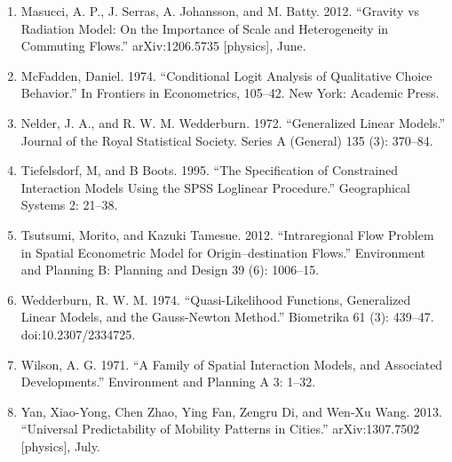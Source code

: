 \documentclass[11pt]{article}
\begin{document}
\begin{enumerate}
  (5): 941--67.
\item
  Masucci, A. P., J. Serras, A. Johansson, and M. Batty. 2012. ``Gravity
  vs Radiation Model: On the Importance of Scale and Heterogeneity in
  Commuting Flows.'' arXiv:1206.5735 {[}physics{]}, June.
\item
  McFadden, Daniel. 1974. ``Conditional Logit Analysis of Qualitative
  Choice Behavior.'' In Frontiers in Econometrics, 105--42. New York:
  Academic Press.
\item
  Nelder, J. A., and R. W. M. Wedderburn. 1972. ``Generalized Linear
  Models.'' Journal of the Royal Statistical Society. Series A (General)
  135 (3): 370--84.
\item
  Tiefelsdorf, M, and B Boots. 1995. ``The Specification of Constrained
  Interaction Models Using the SPSS Loglinear Procedure.'' Geographical
  Systems 2: 21--38.
\item
  Tsutsumi, Morito, and Kazuki Tamesue. 2012. ``Intraregional Flow
  Problem in Spatial Econometric Model for Origin--destination Flows.''
  Environment and Planning B: Planning and Design 39 (6): 1006--15.
\item
  Wedderburn, R. W. M. 1974. ``Quasi-Likelihood Functions, Generalized
  Linear Models, and the Gauss-Newton Method.'' Biometrika 61 (3):
  439--47. doi:10.2307/2334725.
\item
  Wilson, A. G. 1971. ``A Family of Spatial Interaction Models, and
  Associated Developments.'' Environment and Planning A 3: 1--32.
\item
  Yan, Xiao-Yong, Chen Zhao, Ying Fan, Zengru Di, and Wen-Xu Wang. 2013.
  ``Universal Predictability of Mobility Patterns in Cities.''
  arXiv:1307.7502 {[}physics{]}, July.
\end{enumerate}


    
    
    
    
\end{document}
